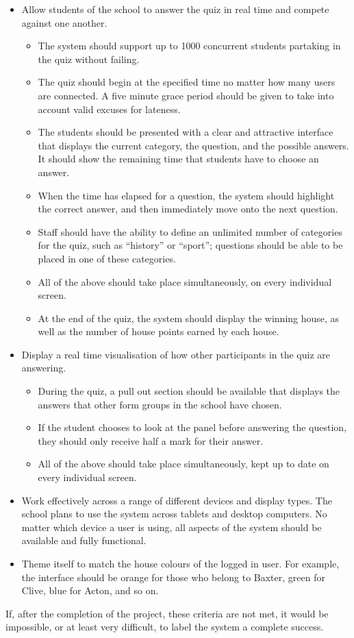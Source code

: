 \begin{itemize}
\begin{itemize}
	\item Allow students of the school to answer the quiz in real time and compete against one another.
		\begin{itemize}
			\item The system should support up to 1000 concurrent students partaking in the quiz without failing.
			\item The quiz should begin at the specified time no matter how many users are connected. A five minute grace period should be given to take into account valid excuses for lateness.
			\item The students should be presented with a clear and attractive interface that displays the current category, the question, and the possible answers. It should show the remaining time that students have to choose an answer.
			\item When the time has elapsed for a question, the system should highlight the correct answer, and then immediately move onto the next question.
			\item Staff should have the ability to define an unlimited number of categories for the quiz, such as ``history'' or ``sport''; questions should be able to be placed in one of these categories.
			\item All of the above should take place simultaneously, on every individual screen.
			\item At the end of the quiz, the system should display the winning house, as well as the number of house points earned by each house.
		\end{itemize}

	\item Display a real time visualisation of how other participants in the quiz are answering.
		\begin{itemize}
			\item During the quiz, a pull out section should be available that displays the answers that other form groups in the school have chosen.
			\item If the student chooses to look at the panel before answering the question, they should only receive half a mark for their answer.
			\item All of the above should take place simultaneously, kept up to date on every individual screen.
		\end{itemize}

	\item Work effectively across a range of different devices and display types. The school plans to use the system across tablets and desktop computers. No matter which device a user is using, all aspects of the system should be available and fully functional.

	\item Theme itself to match the house colours of the logged in user. For example, the interface should be orange for those who belong to Baxter, green for Clive, blue for Acton, and so on.
\end{itemize}

\end{itemize}

If, after the completion of the project, these criteria are not met, it would be impossible, or at least very difficult, to label the system a complete success.
